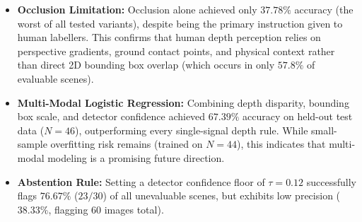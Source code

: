 \documentclass[10pt,twocolumn,letterpaper]{article}
\begin{document}
\begin{table}[t]
\centering
\caption{Diagnostic evaluation of depth metric repair variants, aggregation rules, and multi-modal models against human ground truth ($N = 90$).}
\label{tab:depth_repairs}
\small
{}
\end{table}

\begin{itemize}
    \item \textbf{Occlusion Limitation:} Occlusion alone achieved only $37.78\%$ accuracy (the worst of all tested variants), despite being the primary instruction given to human labellers. This confirms that human depth perception relies on perspective gradients, ground contact points, and physical context rather than direct 2D bounding box overlap (which occurs in only $57.8\%$ of evaluable scenes).
    \item \textbf{Multi-Modal Logistic Regression:} Combining depth disparity, bounding box scale, and detector confidence achieved $67.39\%$ accuracy on held-out test data ($N=46$), outperforming every single-signal depth rule. While small-sample overfitting risk remains (trained on $N=44$), this indicates that multi-modal modeling is a promising future direction.
    \item \textbf{Abstention Rule:} Setting a detector confidence floor of $\tau = 0.12$ successfully flags $76.67\%$ ($23 / 30$) of all unevaluable scenes, but exhibits low precision ($38.33\%$, flagging 60 images total).
\end{itemize}
\end{document}

